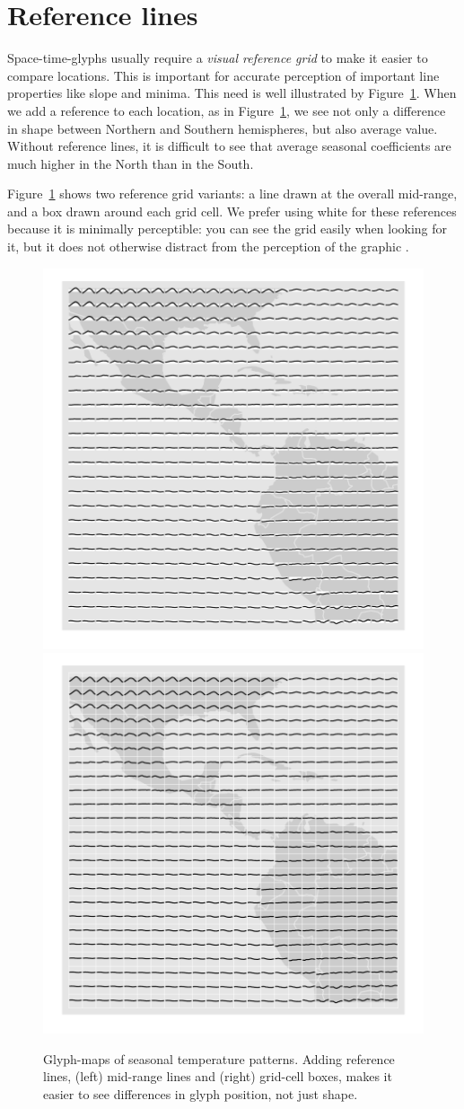 \documentclass[oneside]{article}
\begin{document}
\section{Reference lines}

Space-time-glyphs usually require a \emph{visual reference grid} \citet{cleveland:1993a} to make it easier to compare locations. This is important for accurate perception of important line properties like slope and minima. This need is well illustrated by Figure~\ref{}. When we add a reference to each location, as in Figure~\ref{fig:ref-basic}, we see not only a difference in shape between Northern and Southern hemispheres, but also average value. Without reference lines, it is difficult to see that average seasonal coefficients are much higher in the North than in the South.

Figure~\ref{fig:ref-basic} shows two reference grid variants: a line drawn at the overall mid-range, and a box drawn around each grid cell. We prefer using white for these references because it is minimally perceptible: you can see the grid easily when looking for it, but it does not otherwise distract from the perception of the graphic \citep{carr:1994}.

\begin{figure}[htbp]
  \centering
  \includegraphics[width=0.5\linewidth]{ref-line}%
  \includegraphics[width=0.5\linewidth]{ref-box}

  \caption{Glyph-maps of seasonal temperature patterns. Adding reference lines, (left) mid-range lines and (right) grid-cell boxes, makes it easier to see differences in glyph position, not just shape.}
  \label{fig:ref-basic}
\end{figure}
\end{document}

